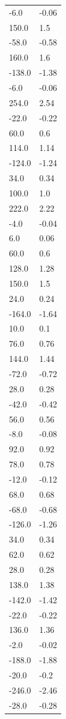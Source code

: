 \begin{longtable}{ll}
-6.0 & -0.06 \\
150.0 & 1.5 \\
-58.0 & -0.58 \\
160.0 & 1.6 \\
-138.0 & -1.38 \\
-6.0 & -0.06 \\
254.0 & 2.54 \\
-22.0 & -0.22 \\
60.0 & 0.6 \\
114.0 & 1.14 \\
-124.0 & -1.24 \\
34.0 & 0.34 \\
100.0 & 1.0 \\
222.0 & 2.22 \\
-4.0 & -0.04 \\
6.0 & 0.06 \\
60.0 & 0.6 \\
128.0 & 1.28 \\
150.0 & 1.5 \\
24.0 & 0.24 \\
-164.0 & -1.64 \\
10.0 & 0.1 \\
76.0 & 0.76 \\
144.0 & 1.44 \\
-72.0 & -0.72 \\
28.0 & 0.28 \\
-42.0 & -0.42 \\
56.0 & 0.56 \\
-8.0 & -0.08 \\
92.0 & 0.92 \\
78.0 & 0.78 \\
-12.0 & -0.12 \\
68.0 & 0.68 \\
-68.0 & -0.68 \\
-126.0 & -1.26 \\
34.0 & 0.34 \\
62.0 & 0.62 \\
28.0 & 0.28 \\
138.0 & 1.38 \\
-142.0 & -1.42 \\
-22.0 & -0.22 \\
136.0 & 1.36 \\
-2.0 & -0.02 \\
-188.0 & -1.88 \\
-20.0 & -0.2 \\
-246.0 & -2.46 \\
-28.0 & -0.28 \\

\end{longtable}
